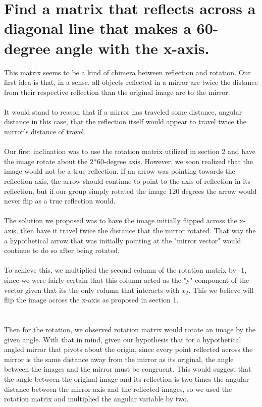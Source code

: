 \section{\LARGE Find a matrix that reflects across a diagonal line that makes a 60-degree angle with the x-axis.}
This matrix seems to be a kind of chimera between reflection and rotation. Our first idea is that, in a sense, all objects reflected in a mirror are twice the distance from their respective reflection than the original image are to the mirror. \\\\
It would stand to reason that if a mirror has traveled some distance, angular distance in this case, that the reflection itself would appear to travel twice the mirror's distance of travel.\\\\ Our first inclination was to use the rotation matrix utilized in section 2 and have the image rotate about the 2*60-degree axis. However, we soon realized that the image would not be a true reflection. If an arrow was pointing towards the reflection axis, the arrow should continue to point to the axis of reflection in its reflection, but if our group simply rotated the image 120 degrees the arrow would never flip as a true reflection would.\\\\
The solution we proposed was to have the image initially flipped across the x-axis, then have it travel twice the distance that the mirror rotated. That way the a hypothetical arrow that was initially pointing at the "mirror vector" would continue to do so after being rotated.\\\\To achieve this, we multiplied the second column of the rotation matrix by -1, since we were fairly certain that this column acted as the "y" component of the vector given that its the only column that interacts with $x_2$. This we believe will flip the image across the x-axis as proposed in section 1.\\\\\\Then for the rotation, we observed rotation matrix would rotate an image by the given angle. With that in mind, given our hypothesis that for a hypothetical angled mirror that pivots about the origin, since every point reflected across the mirror is the same distance away from the mirror as its original, the angle between the images and the mirror must be congruent. This would suggest that the angle between the original image and its reflection is two times the angular distance between the mirror axis and the reflected images, so we used the rotation matrix and multiplied the angular variable by two.


